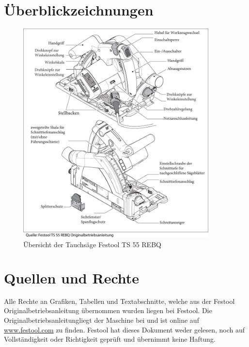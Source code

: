 \documentclass{\basedir/fablab-document}
\begin{document}
\section{Überblickzeichnungen}
\begin{figure}[h]
	\centering
	\includegraphics[width=0.9\textwidth]{img/festool-uebersicht.pdf}
	\caption{Übersicht der Tauchsäge Festool TS 55 REBQ}
	\label{fig:uebersicht}
\end{figure}












\newpage
\section{Quellen und Rechte}
\label{quellen}
Alle Rechte an Grafiken, Tabellen und Textabschnitte, welche aus der Festool Originalbetriebsanleitung übernommen wurden liegen bei Festool. Die \glqq Originalbetriebsanleitung\grqq liegt der Maschine bei und ist online auf \url{www.festool.com} zu finden. Festool hat dieses Dokument weder gelesen, noch auf Vollständigkeit oder Richtigkeit geprüft und übernimmt keine Haftung.
\end{document}
